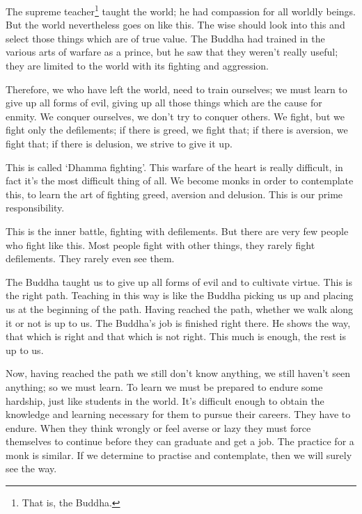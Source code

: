 The supreme teacher\footnote{That is, the Buddha.} taught the world; he had compassion for all worldly beings. But the world nevertheless goes on like this. The wise should look into this and select those things which are of true value. The Buddha had trained in the various arts of warfare as a prince, but he saw that they weren't really useful; they are limited to the world with its fighting and aggression. 

Therefore, we who have left the world, need to train ourselves; we must learn to give up all forms of evil, giving up all those things which are the cause for enmity. We conquer ourselves, we don't try to conquer others. We fight, but we fight only the defilements; if there is greed, we fight that; if there is aversion, we fight that; if there is delusion, we strive to give it up. 

This is called `Dhamma fighting'. This warfare of the heart is really difficult, in fact it's the most difficult thing of all. We become monks in order to contemplate this, to learn the art of fighting greed, aversion and delusion. This is our prime responsibility. 

This is the inner battle, fighting with defilements. But there are very few people who fight like this. Most people fight with other things, they rarely fight defilements. They rarely even see them. 

The Buddha taught us to give up all forms of evil and to cultivate virtue. This is the right path. Teaching in this way is like the Buddha picking us up and placing us at the beginning of the path. Having reached the path, whether we walk along it or not is up to us. The Buddha's job is finished right there. He shows the way, that which is right and that which is not right. This much is enough, the rest is up to us. 

Now, having reached the path we still don't know anything, we still haven't seen anything; so we must learn. To learn we must be prepared to endure some hardship, just like students in the world. It's difficult enough to obtain the knowledge and learning necessary for them to pursue their careers. They have to endure. When they think wrongly or feel averse or lazy they must force themselves to continue before they can graduate and get a job. The practice for a monk is similar. If we determine to practise and contemplate, then we will surely see the way. 

